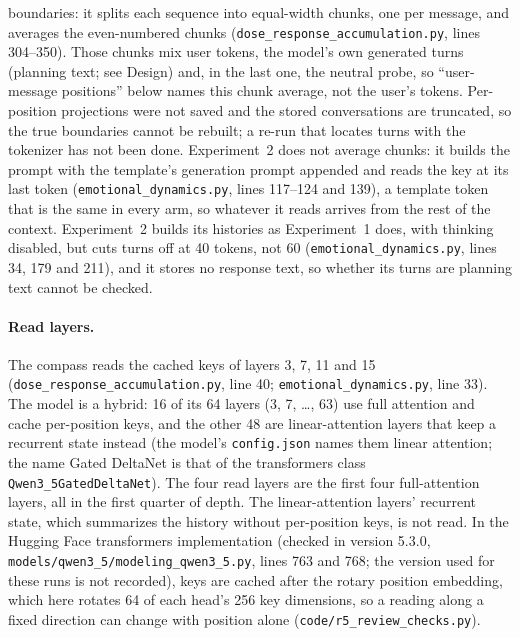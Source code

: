 \documentclass[11pt,a4paper]{article}
\begin{document}
boundaries: it splits each sequence into equal-width chunks, one per
message, and averages the even-numbered chunks
(\texttt{dose\_response\_accumulation.py}, lines 304--350). Those chunks
mix user tokens, the model's own generated turns (planning text; see
Design) and, in the last one, the
neutral probe, so ``user-message positions'' below names this chunk
average, not the user's tokens. Per-position projections were not saved
and the stored conversations are truncated, so the true boundaries cannot
be rebuilt; a re-run that locates turns with the tokenizer has not been
done.
Experiment~2 does not average chunks: it builds the prompt with the template's generation prompt appended and reads the key at its last token
(\texttt{emotional\_dynamics.py}, lines 117--124 and 139), a template
token that is the same in every arm, so whatever it reads arrives from
the rest of the context. Experiment~2 builds its histories as Experiment~1 does, with thinking
disabled, but cuts turns off at 40 tokens, not 60
(\texttt{emotional\_dynamics.py}, lines 34, 179 and 211), and it stores no response text, so whether its turns are planning text cannot be checked.

\paragraph{Read layers.} {\sloppy The compass reads the cached keys of layers 3,
7, 11 and 15 (\texttt{dose\_response\_\allowbreak accumulation.py}, line 40;
\texttt{emotional\_dynamics.py}, line 33). The model is a hybrid: 16 of
its 64 layers (3, 7, \ldots, 63) use full attention and cache
per-position keys, and the other 48 are linear-attention layers that keep a recurrent state
instead (the model's \texttt{config.json} names them linear attention; the
name Gated DeltaNet is that of the transformers class
\texttt{Qwen3\_5\allowbreak GatedDeltaNet}). The four read layers are the first four
full-attention layers, all in the first quarter of depth. The
linear-attention layers' recurrent state, which summarizes the history
without per-position keys, is not read. In the Hugging Face transformers
implementation (checked in version 5.3.0,
\texttt{models/\allowbreak qwen3\_5/\allowbreak modeling\_qwen3\_5.py}, lines 763 and 768; the
version used for these runs is not recorded), keys are cached after the
rotary position embedding, which here rotates 64 of each head's 256 key
dimensions, so a reading along a fixed direction can change with
position alone (\texttt{code/r5\_review\_checks.py}).\par}
\end{document}
